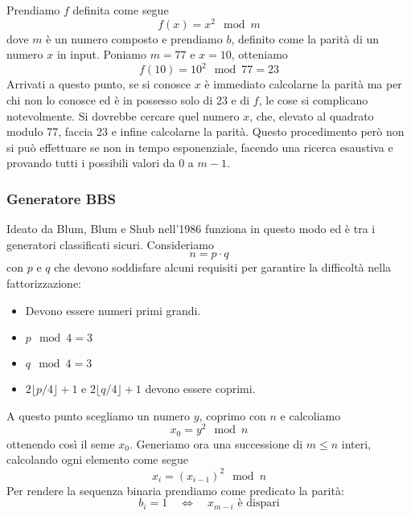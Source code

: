 \begin{example}
	Prendiamo $f$ definita come segue
	\[ f(x) = x^2 \mod{m} \]
	dove $m$ \`e un numero composto e prendiamo $b$, definito come la parit\`a di un numero $x$ in input. Poniamo
	$m = 77$ e $x = 10$, otteniamo
	\[ f(10) = 10^2 \mod{77} = 23 \]
	Arrivati a questo punto, se si conosce $x$ \`e immediato calcolarne la parit\`a ma per chi non lo conosce ed \`e
	in possesso solo di 23 e di $f$, le cose si complicano notevolmente. Si dovrebbe cercare quel numero $x$, che,
	elevato al quadrato modulo 77, faccia 23 e infine calcolarne la parit\`a. Questo procedimento per\`o non si pu\`o
	effettuare se non in tempo esponenziale, facendo una ricerca esaustiva e provando tutti i possibili valori da 0 a
	$m-1$.
\end{example}

\subsubsection{Generatore BBS}
Ideato da Blum, Blum e Shub nell'1986 funziona in questo modo ed \`e tra i generatori classificati sicuri. Consideriamo
\[ n = p \cdot q \]
con $p$ e $q$ che devono soddisfare alcuni requisiti per garantire la difficolt\`a nella fattorizzazione:
\begin{itemize}
	\item Devono essere numeri primi grandi.
	\item $p \mod{4} = 3$
	\item $q \mod{4} = 3$
	\item $2 \lfloor p / 4 \rfloor + 1$ e $2 \lfloor q / 4 \rfloor + 1$ devono essere coprimi.
\end{itemize}
A questo punto scegliamo un numero $y$, coprimo con $n$ e calcoliamo
\[ x_0 = y^2 \mod{n} \]
ottenendo cos\`i il seme $x_0$. Generiamo ora una successione di $m \leq n$ interi, calcolando ogni elemento come segue
\[ x_i = (x_{i-1})^2 \mod{n} \]
Per rendere la sequenza binaria prendiamo come predicato la parit\`a:
\[ b_i = 1 \quad \Leftrightarrow \quad x_{m-i} \text{ \`e dispari} \]

